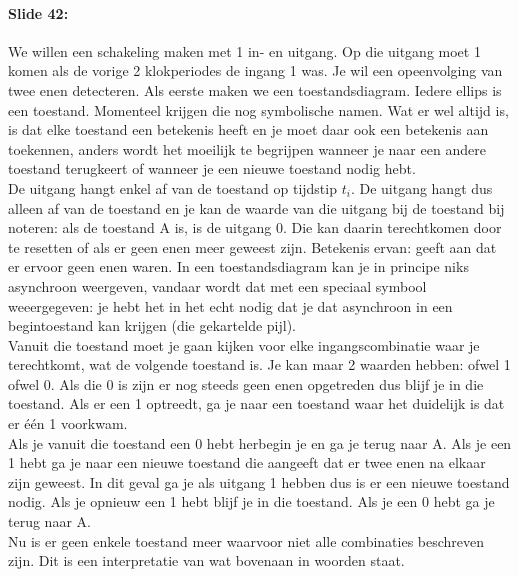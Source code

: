 \documentclass[10pt,a4paper]{book}
\begin{document}
\paragraph{Slide 42:} We willen een schakeling maken met 1 in- en uitgang. Op die uitgang moet 1 komen als de vorige 2 klokperiodes de ingang 1 was. Je wil een opeenvolging van twee enen detecteren. Als eerste maken we een toestandsdiagram. Iedere ellips is een toestand. Momenteel krijgen die nog symbolische namen. Wat er wel altijd is, is dat elke toestand een betekenis heeft en je moet daar ook een betekenis aan toekennen, anders wordt het moeilijk te begrijpen wanneer je naar een andere toestand terugkeert of wanneer je een nieuwe toestand nodig hebt.\\
De uitgang hangt enkel af van de toestand op tijdstip $t_i$. De uitgang hangt dus alleen af van de toestand en je kan de waarde van die uitgang bij de toestand bij noteren: als de toestand A is, is de uitgang 0. Die kan daarin terechtkomen door te resetten of als er geen enen meer geweest zijn. Betekenis ervan: geeft aan dat er ervoor geen enen waren. In een toestandsdiagram kan je in principe niks asynchroon weergeven, vandaar wordt dat met een speciaal symbool weeergegeven: je hebt het in het echt nodig dat je dat asynchroon in een begintoestand kan krijgen (die gekartelde pijl).\\
Vanuit die toestand moet je gaan kijken voor elke ingangscombinatie waar je terechtkomt, wat de volgende toestand is. Je kan maar 2 waarden hebben: ofwel 1 ofwel 0. Als die 0 is zijn er nog steeds geen enen opgetreden dus blijf je in die toestand. Als er een 1 optreedt, ga je naar een toestand waar het duidelijk is dat er \'e\'en 1 voorkwam.\\
Als je vanuit die toestand een 0 hebt herbegin je en ga je terug naar A. Als je een 1 hebt ga je naar een nieuwe toestand die aangeeft dat er twee enen na elkaar zijn geweest. In dit geval ga je als uitgang 1 hebben dus is er een nieuwe toestand nodig. Als je opnieuw een 1 hebt blijf je in die toestand. Als je een 0 hebt ga je terug naar A.\\
Nu is er geen enkele toestand meer waarvoor niet alle combinaties beschreven zijn. Dit is een interpretatie van wat bovenaan in woorden staat.
\end{document}
